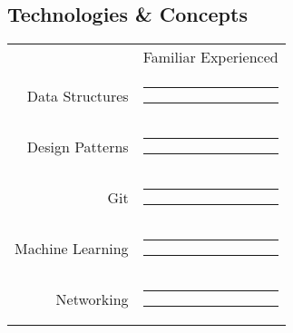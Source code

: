 \documentclass[11pt]{article} 						%
\newcommand{\smpad}{\hspace*{.2em}}
\begin{document}
\begin{multicols}{2}
{{\begin{minipage}[t][\paperheight]{.38\textwidth}
\begin{minipage}[t][\paperheight]{.95\textwidth}
\subsection{\large\dotfill Technologies \& Concepts\dotfill}
\vspace{-1ex}\hspace{.5em}
\begin{tabularx}{\textwidth}{@{}r@{}c@{}}
	\hfill & \footnotesize Familiar \hspace*{1.7em} Experienced\\
	\small Data Structures \smpad&%
		\color{skillLvl}\rule[.25ex]{7.5em}{1ex}%
		\color{skillBkgd}\rule[.25ex]{2.5em}{1ex}\\
	\small Design Patterns \smpad&%
		\color{skillLvl}\rule[.25ex]{5em}{1ex}%
		\color{skillBkgd}\rule[.25ex]{5em}{1ex}\\
	Git \smpad&%
		\color{skillLvl}\rule[.25ex]{4em}{1ex}%
		\color{skillBkgd}\rule[.25ex]{6em}{1ex}\\
	\small Machine Learning \smpad&%
		\color{skillLvl}\rule[.25ex]{3em}{1ex}%
		\color{skillBkgd}\rule[.25ex]{7em}{1ex}\\
	Networking \smpad&%
		\color{skillLvl}\rule[.25ex]{3em}{1ex}%
		\color{skillBkgd}\rule[.25ex]{7em}{1ex}\\
\end{tabularx}
%
\end{minipage}\end{minipage}}}%
%
%
\columnbreak

\end{multicols}
\end{document}
